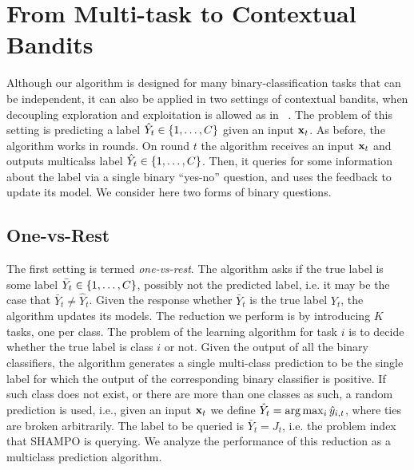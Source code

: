 \chapter{From Multi-task to Contextual Bandits}\label{chap:multiclass}
Although our algorithm is designed for many binary-classification tasks that can be independent, 
it can also be applied in two settings of contextual bandits, when decoupling exploration and 
exploitation is allowed as in ~\cite{DBLP:conf/icml/YuM09,DBLP:conf/icml/AvnerMS12}. 
The problem of this setting is predicting a label $\hat{Y}_t \in\{ 1 , \ldots , C\}$ given an input $\mathbf{x}_{t}$. 
As before, the algorithm works in rounds. On round $t$ the algorithm receives an input $\mathbf{x}_{t}$ and 
outputs  multicalss label $\hat{Y}_t\in\{1 , \ldots , C\}$. 
Then, it queries for some information about the label via a single binary ``yes-no'' question, and uses the 
feedback to update its model. We consider here two forms of binary questions.

\section{One-vs-Rest}
The first setting is termed {\em one-vs-rest}. The algorithm asks if the true label is some label 
$\bar{Y}_t\in\{ 1 , \ldots , C\}$, possibly not the predicted label, i.e. it may be the case that 
$\bar{Y}_t \neq\hat{Y}_t$. Given the response whether  $\bar{Y}_t$ is the true label $Y_t$, the algorithm 
updates its models. The reduction we perform is by introducing $K$ tasks, one per class. 
The problem of the learning algorithm for task $i$ is to decide whether the true label is class $i$ or not. 
Given the output of all the binary classifiers, the algorithm generates a single multi-class prediction to be the 
single label for which the output of the corresponding binary classifier is positive. If such class does not 
exist, or there are more than one classes  as such, a random prediction is used, i.e., given an input $\mathbf{x}_{t}$ 
we define $\hat{Y}_t = \arg\max_i \hat{y}_{i,t}$, where ties are broken arbitrarily. The label to be queried is 
$\bar{Y}_t=J_t$, i.e. the problem index that SHAMPO is querying. We analyze the performance of this 
reduction as a multiclass prediction algorithm.

